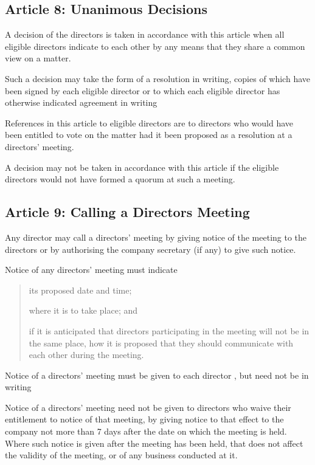 \documentclass[letterpaper,10pt,openany,oneside,english]{sphinxmanual}
\begin{document}
\subsection{Article 8: Unanimous Decisions}
\label{\detokenize{directors:article-8-unanimous-decisions}}\label{\detokenize{directors:article-8}}
 A decision of the directors is taken in accordance with this article when all eligible directors indicate to each other by any means that they share a common view on a matter.

 Such a decision may take the form of a resolution in writing, copies of which have been signed by each eligible director or to which each eligible director has otherwise indicated agreement in writing

 References in this article to eligible directors are to directors who would have been entitled to vote on the matter had it been proposed as a resolution at a directors’ meeting.

 A decision may not be taken in accordance with this article if the eligible directors would not have formed a quorum at such a meeting.


\subsection{Article 9: Calling a Directors Meeting}
\label{\detokenize{directors:article-9-calling-a-directors-meeting}}\label{\detokenize{directors:article-9}}
 Any director may call a directors’ meeting by giving notice of the meeting to the directors or by authorising the company secretary (if any) to give such notice.

 Notice of any directors’ meeting must indicate
\begin{quote}

 its proposed date and time;

 where it is to take place; and

 if it is anticipated that directors participating in the meeting will not be in the same place, how it is proposed that they should communicate with each other during the meeting.
\end{quote}

 Notice of a directors’ meeting must be given to each director , but need not be in writing

 Notice of a directors’ meeting need not be given to directors who waive their entitlement to notice of that meeting, by giving notice to that effect to the company not more than 7 days after the date on which the meeting is held. Where such notice is given after the meeting has been held, that does not affect the validity of the meeting, or of any business conducted at it.
\end{document}

